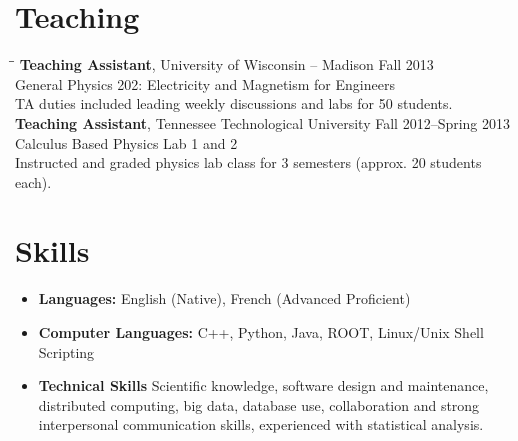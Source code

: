 \documentclass[10pt]{res} %
\begin{document}
\begin{resume}
\section{Teaching}
\vspace{-0.1in}

\begin{tabbing}
\hspace{3.5 in}\= \hspace{1.4in}\= \kill %
\textbf{Teaching Assistant}, University of Wisconsin -- Madison \>\> Fall 2013 \\
General Physics 202: Electricity and Magnetism for Engineers \\
TA duties included leading weekly discussions and labs for 50 students. \\
\textbf{Teaching Assistant}, Tennessee Technological University \>\> Fall 2012--Spring 2013 \\
Calculus Based Physics Lab 1 and 2 \\
Instructed and graded physics lab class for 3 semesters (approx. 20 students each). \\
\end{tabbing}

\section{Skills}
\begin{itemize}
\item {\bf Languages:} English (Native),   French (Advanced Proficient)
\item {\bf Computer Languages: } C++,  Python, Java, ROOT, Linux/Unix Shell Scripting 
\item {\bf Technical Skills} Scientific knowledge, software design and maintenance, distributed computing, big data, database use, collaboration and strong interpersonal communication skills, experienced with statistical analysis. 
\end{itemize} 

\end{resume}
\end{document}
